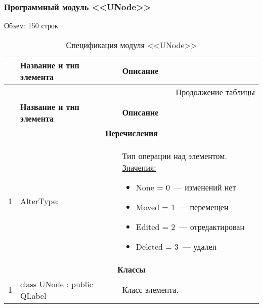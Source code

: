 \subsubsection*{Программный модуль <<UNode>>}
Объем: 150 строк

\small
\singlespacing
\begin{longtable}[h]{|p{}|p{}|p{}|}
  \caption{Спецификация модуля <<UNode>>}
	\\ \hline
	  \textbf{\No}                  &
	  \textbf{Название и тип элемента}  &
	  \textbf{Описание}
	\\ \hline
  \endfirsthead

  \multicolumn{3}{r}{Продолжение таблицы \thetable{}}
  \\ \hline
	  \textbf{\No}                  &
	  \textbf{Название и тип элемента}  &
	  \textbf{Описание}
	\\ \hline
  \endhead

  \multicolumn{3}{|c|}{\textbf{Перечисления}} \\
  \hline
  1 & AlterType; & Тип операции над элементом.\newline
    \uline{Значения:}
    \begin{itemize}[nolistsep,label=,leftmargin=0cm]
      \item None    = 0~--- изменений нет
      \item Moved   = 1~--- перемещен
      \item Edited  = 2~--- отредактирован
      \item Deleted = 3~--- удален
    \end{itemize}\\ \hline

  \multicolumn{3}{|c|}{\textbf{Классы}} \\
  \hline
  1 & class UNode : public QLabel & Класс элемента. \\ \hline
\end{longtable}
\normalsize
\onehalfspacing


